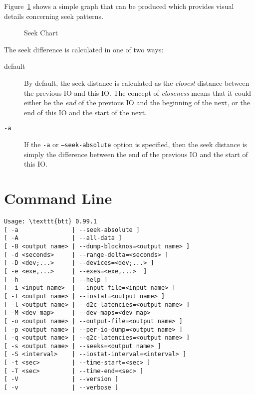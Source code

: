\documentclass{article}
\begin{document}
  Figure~\ref{fig:seek} shows a simple graph that can be produced which
  provides visual details concerning seek patterns.

  \begin{figure}[h!]
  \leavevmode\centering
  \caption{\label{fig:seek}Seek Chart}
  \end{figure}
  \FloatBarrier

  The seek difference is calculated in one of two ways:

  \begin{description}
    \item[default] By default, the seek distance is calculated as the
    \emph{closest} distance between the previous IO and this IO. The
    concept of \emph{closeness} means that it could either be the
    \emph{end} of the previous IO and the beginning of the next, or the
    end of this IO and the start of the next.

    \item[\texttt{-a}] If the \texttt{-a} or \texttt{--seek-absolute}
    option is specified, then the seek distance is simply the difference
    between the end of the previous IO and the start of this IO.
  \end{description}

\newpage\section{\label{sec:cmd-line}Command Line}

\begin{verbatim}
Usage: \texttt{btt} 0.99.1 
[ -a               | --seek-absolute ]
[ -A               | --all-data ]
[ -B <output name> | --dump-blocknos=<output name> ]
[ -d <seconds>     | --range-delta=<seconds> ]
[ -D <dev;...>     | --devices=<dev;...> ]
[ -e <exe,...>     | --exes=<exe,...>  ]
[ -h               | --help ]
[ -i <input name>  | --input-file=<input name> ]
[ -I <output name> | --iostat=<output name> ]
[ -l <output name> | --d2c-latencies=<output name> ]
[ -M <dev map>     | --dev-maps=<dev map>
[ -o <output name> | --output-file=<output name> ]
[ -p <output name> | --per-io-dump=<output name> ]
[ -q <output name> | --q2c-latencies=<output name> ]
[ -s <output name> | --seeks=<output name> ]
[ -S <interval>    | --iostat-interval=<interval> ]
[ -t <sec>         | --time-start=<sec> ]
[ -T <sec>         | --time-end=<sec> ]
[ -V               | --version ]
[ -v               | --verbose ]
\end{verbatim}
\end{document}
